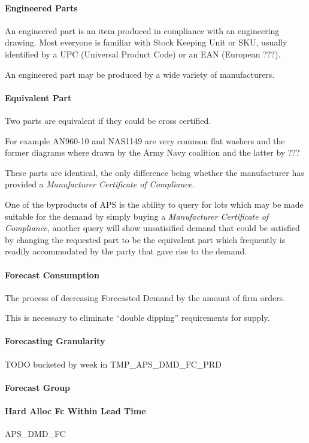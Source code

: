 \paragraph{Engineered Parts}
An engineered part is an item produced in compliance with an engineering
drawing.  Most everyone is familiar
with Stock Keeping Unit or SKU, usually identified by a UPC (Universal Product
Code) or an EAN (European ???).

An engineered part may be produced by a wide variety of manufacturers.
\paragraph{Equivalent Part}
Two parts are equivalent if they could be cross certified.   

For example AN960-10 and NAS1149 are very common flat washers and the former diagrams where drawn
by the Army Navy coalition and the latter by ???

These parts are identical, the only difference being whether the manufacturer 
has provided a \textit{Manufacturer Certificate of Compliance}.  

One of the byproducts of APS is the ability to query for lots which may be made suitable for the demand by
simply buying a \textit{Manufacturer Certificate of Compliance}, another query will show unsatisified demand
that could be satisfied by changing the requested part to be the equivalent part which frequently is 
readily accommodated by the party that gave rise to the demand. 
\paragraph{Forecast Consumption}
The process of decreasing Forecasted Demand by the amount of firm orders.  

This is necessary to eliminate ``double dipping'' requirements for supply.
\paragraph{Forecasting Granularity}
TODO bucketed by week in TMP\_APS\_DMD\_FC\_PRD
\paragraph{Forecast Group}
\paragraph{Hard Alloc Fc Within Lead Time}
APS\_DMD\_FC

